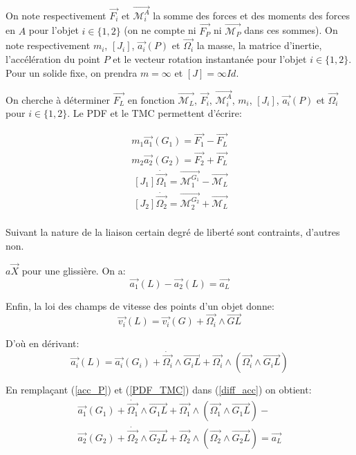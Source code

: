 \documentclass[10pt,a4paper]{llncs}
\newcommand{\vect}[1]{\overrightarrow{#1}}
\begin{document}
On note respectivement $\vect{F_i}$ et $\vect{\mathcal{M}^A_i}$ la somme des forces
et des moments des forces en $A$ pour l'objet $i \in \{1,2\}$ (on ne compte ni 
$\vect{F_P}$ ni $\vect{\mathcal{M}_P}$ dans ces sommes). On note respectivement
$m_i$, $[J_i]$, $\vect{a_i}(P)$ et $\vect{\Omega_i}$ la masse, la matrice d'inertie,
l'accélération du point $P$ et le vecteur rotation instantanée pour l'objet $i \in \{1,2\}$.
Pour un solide fixe, on prendra $m = \infty$ et $[J] = \infty Id$.

\vspace{0.3cm}
On cherche à déterminer $\vect{F_L}$ en fonction $\vect{\mathcal{M}_L}$, $\vect{F_i}$, $\vect{\mathcal{M}^A_i}$,
$m_i$, $[J_i]$, $\vect{a_i}(P)$ et $\vect{\Omega_i}$ pour $i \in \{1,2\}$.
Le PDF et le TMC permettent d'écrire:

\begin{equation}
\label{PDF_TMC}
\begin{array}{c}
m_1\vect{a_1}(G_1) = \vect{F_1} - \vect{F_L} \\
m_2\vect{a_2}(G_2) = \vect{F_2} + \vect{F_L} \\
~[J_1]\dot{\vect{\Omega_1}} = \vect{\mathcal{M}^{G_1}_1} - \vect{\mathcal{M}_L}\\
~[J_2]\dot{\vect{\Omega_2}} = \vect{\mathcal{M}^{G_2}_2} + \vect{\mathcal{M}_L}\\
\end{array}
\end{equation}


Suivant la nature de la liaison certain degré de liberté sont contraints, d'autres non.

$a\vect{X}$ pour une glissière. On a:
\begin{equation}
\label{diff_acc}
\vect{a_1}(L) - \vect{a_2}(L) = \vect{a_L}
\end{equation}

Enfin, la loi des champs de vitesse des points d'un objet donne:
\begin{equation}
\vect{v_i}(L) = \vect{v_i}(G) + \vect{\Omega_i} \wedge \vect{GL} 
\end{equation}

D'où en dérivant:
\begin{equation}
\label{acc_P}
\vect{a_i}(L) = \vect{a_i}(G_i) + \dot{\vect{\Omega_i}} \wedge \vect{G_iL} + \vect{\Omega_i} \wedge (\vect{\Omega_i} \wedge \vect{G_iL}) 
\end{equation}

En remplaçant (\ref{acc_P}) et (\ref{PDF_TMC}) dans (\ref{diff_acc}) on obtient:
\begin{equation}
\label{diff_acc}
\begin{array}{l}
\vect{a_1}(G_1) + \dot{\vect{\Omega_1}} \wedge \vect{G_1L} + \vect{\Omega_1} \wedge (\vect{\Omega_1} \wedge \vect{G_1L}) - \\
\vect{a_2}(G_2) + \dot{\vect{\Omega_2}} \wedge \vect{G_2L} + \vect{\Omega_2} \wedge (\vect{\Omega_2} \wedge \vect{G_2L}) = \vect{a_L}
\end{array}
\end{equation}
\end{document}
